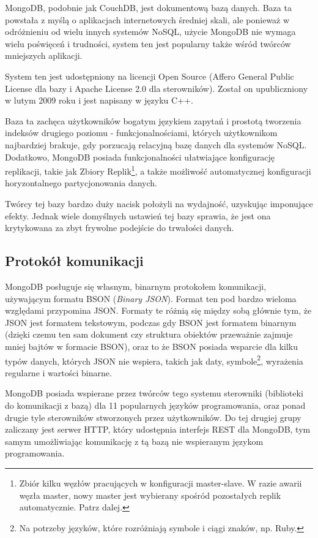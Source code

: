 MongoDB, podobnie jak CouchDB, jest dokumentową bazą danych.
Baza ta powstała z myślą o aplikacjach internetowych średniej skali, ale ponieważ w odróżnieniu od wielu innych systemów NoSQL, użycie MongoDB nie wymaga wielu poświęceń i trudności, system ten jest popularny także wśród twórców mniejszych aplikacji.

System ten jest udostępniony na licencji Open Source (Affero General Public License dla bazy i Apache License 2.0 dla sterowników).
Został on upubliczniony w lutym 2009 roku i jest napisany w języku C++.

Baza ta zachęca użytkowników bogatym językiem zapytań i prostotą tworzenia indeksów drugiego poziomu - funkcjonalnościami, których użytkownikom najbardziej brakuje, gdy porzucają relacyjną bazę danych dla systemów NoSQL.
Dodatkowo, MongoDB posiada funkcjonalności ułatwiające konfigurację replikacji, takie jak Zbiory Replik\footnote{Zbiór kilku węzłów pracujących w konfiguracji master-slave. W razie awarii węzła master, nowy master jest wybierany spośród pozostałych replik automatycznie. Patrz dalej.}, a także możliwość automatycznej konfiguracji horyzontalnego partycjonowania danych.

Twórcy tej bazy bardzo duży nacisk położyli na wydajność, uzyskując imponujące efekty.
Jednak wiele domyślnych ustawień tej bazy sprawia, że jest ona krytykowana za zbyt frywolne podejście do trwałości danych.

\subsection*{Protokół komunikacji}

MongoDB posługuje się własnym, binarnym protokołem komunikacji, używającym formatu BSON (\emph{Binary JSON}).
Format ten pod bardzo wieloma względami przypomina JSON.
Formaty te różnią się między sobą głównie tym, że JSON jest formatem tekstowym, podczas gdy BSON jest formatem binarnym (dzięki czemu ten sam dokument czy struktura obiektów przeważnie zajmuje mniej bajtów w formacie BSON), oraz to że BSON posiada wsparcie dla kilku typów danych, których JSON nie wspiera, takich jak daty, symbole\footnote{Na potrzeby języków, które rozróżniają symbole i ciągi znaków, np. Ruby.}, wyrażenia regularne i wartości binarne.

MongoDB posiada wspierane przez twórców tego systemu sterowniki (biblioteki do komunikacji z bazą) dla 11 popularnych języków programowania, oraz ponad drugie tyle sterowników stworzonych przez użytkowników.
Do tej drugiej grupy zaliczany jest serwer HTTP, który udostępnia interfejs REST dla MongoDB, tym samym umożliwiając komunikację z tą bazą nie wspieranym językom programowania.


